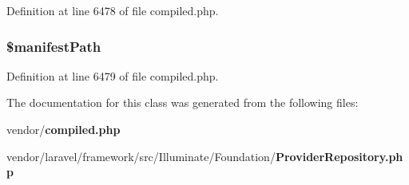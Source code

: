 Definition at line 6478 of file compiled.\+php.

\subsubsection[{\$manifest\+Path}]{\setlength{\rightskip}{0pt plus 5cm}\$manifest\+Path\hspace{0.3cm}{\ttfamily [protected]}}\label{class_illuminate_1_1_foundation_1_1_provider_repository_accfa7ea8d5f449ade06617b91ae47058}


Definition at line 6479 of file compiled.\+php.



The documentation for this class was generated from the following files\+:\begin{DoxyCompactItemize}
\item 
vendor/{\bf compiled.\+php}\item 
vendor/laravel/framework/src/\+Illuminate/\+Foundation/{\bf Provider\+Repository.\+php}\end{DoxyCompactItemize}

